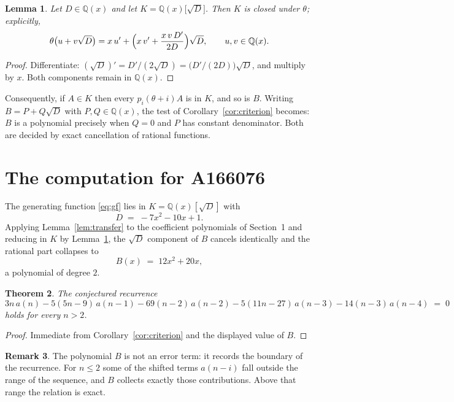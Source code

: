 \documentclass[11pt,a4paper]{article}
\theoremstyle{plain}
\newtheorem{theorem}{Theorem}
\newtheorem{lemma}[theorem]{Lemma}
\theoremstyle{definition}
\newtheorem{remark}[theorem]{Remark}
\begin{document}
\begin{lemma}\label{lem:field}
Let $D\in\mathbb{Q}(x)$ and let $K=\mathbb{Q}(x)\bigl[\sqrt{D}\bigr]$. Then $K$ is closed
under $\theta$; explicitly,
\[
\theta\bigl(u+v\sqrt{D}\bigr)=x\,u'+\Bigl(x\,v'+\frac{x\,v\,D'}{2D}\Bigr)\sqrt{D},
\qquad u,v\in\mathbb{Q}(x).
\]
\end{lemma}

\begin{proof}
Differentiate: $(\sqrt{D})'=D'/(2\sqrt{D})=\bigl(D'/(2D)\bigr)\sqrt{D}$, and multiply by
$x$. Both components remain in $\mathbb{Q}(x)$.
\end{proof}

Consequently, if $A\in K$ then every $p_{i}(\theta+i)A$ is in $K$, and so is $B$. Writing
$B=P+Q\sqrt{D}$ with $P,Q\in\mathbb{Q}(x)$, the test of Corollary~\ref{cor:criterion}
becomes: $B$ is a polynomial precisely when $Q=0$ and $P$ has constant denominator. Both
are decided by exact cancellation of rational functions.

\section{The computation for A166076}

The generating function \eqref{eq:gf} lies in $K=\mathbb{Q}(x)[\sqrt{D}]$ with
\[
D \;=\; - 7 x^{2} - 10 x + 1 .
\]
Applying Lemma~\ref{lem:transfer} to the coefficient polynomials of Section~1 and reducing
in $K$ by Lemma~\ref{lem:field}, the $\sqrt{D}$ component of $B$ cancels identically and
the rational part collapses to
\[
B(x)\;=\;12 x^{2} + 20 x ,
\]
a polynomial of degree $2$.

\begin{theorem}
The conjectured recurrence
\[
3 n\,a(n) -  5 \left(5 n - 9\right)\,a(n-1) -  69 \left(n - 2\right)\,a(n-2) -  5 \left(11 n - 27\right)\,a(n-3) -  14 \left(n - 3\right)\,a(n-4) \;=\;0
\]
holds for every $n>2$.
\end{theorem}

\begin{proof}
Immediate from Corollary~\ref{cor:criterion} and the displayed value of $B$.
\end{proof}

\begin{remark}
The polynomial $B$ is not an error term: it records the boundary of the recurrence. For
$n\le2$ some of the shifted terms $a(n-i)$ fall outside the range of the sequence,
and $B$ collects exactly those contributions. Above that range the relation is exact.
\end{remark}
\end{document}
